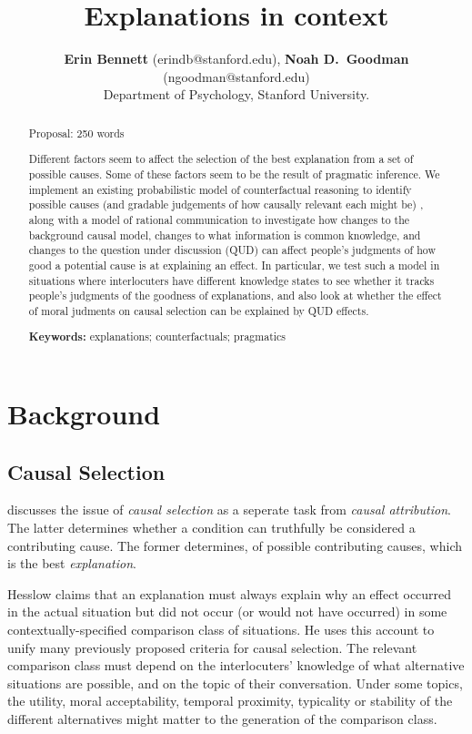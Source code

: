 \documentclass[10pt,letterpaper]{article}
\title{Explanations in context}
\author{{\large \bf Erin Bennett} (erindb@stanford.edu), {\large \bf Noah D.~Goodman} (ngoodman@stanford.edu)\\
  Department of Psychology, Stanford University.}
\begin{document}
\maketitle

\begin{abstract}

Proposal: 250 words

Different factors seem to affect the selection of the best explanation from a set of possible causes. Some of these factors seem to be the result of pragmatic inference. We implement an existing probabilistic model of counterfactual reasoning to identify possible causes (and gradable judgements of how causally relevant each might be) \cite{LucasKemp2015}, along with a model of rational communication \cite{FrankGoodman2012, GoodmanStuhlmuller2013} to investigate how changes to the background causal model, changes to what information is common knowledge, and changes to the question under discussion (QUD) can affect people's judgments of how good a potential cause is at explaining an effect. In particular, we test such a model in situations where interlocuters have different knowledge states to see whether it tracks people's judgments of the goodness of explanations, and also look at whether the effect of moral judments on causal selection can be explained by QUD effects.

\textbf{Keywords:} 
explanations; counterfactuals; pragmatics
\end{abstract}

\section{Background}

\subsection{Causal Selection}

 discusses the issue of \emph{causal selection} as a seperate task from \emph{causal attribution}.
The latter determines whether a condition can truthfully be considered a contributing cause.
The former determines, of possible contributing causes, which is the best \emph{explanation}.

Hesslow claims that an explanation must always explain why an effect occurred in the actual situation but did not occur (or would not have occurred) in some contextually-specified comparison class of situations.
He uses this account to unify many previously proposed criteria for causal selection. %
The relevant comparison class must depend on the interlocuters' knowledge of what alternative situations are possible, and on the topic of their conversation.
Under some topics, the utility, moral acceptability, temporal proximity, typicality or stability of the different alternatives might matter to the generation of the comparison class.
\end{document}

